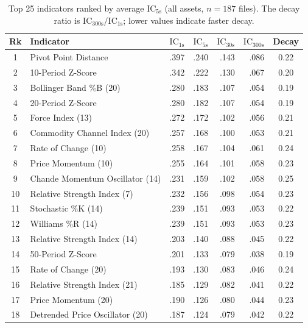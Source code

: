 \documentclass[12pt,a4paper]{article}
\theoremstyle{definition}
\theoremstyle{remark}
\newcommand{\IC}{\mathrm{IC}}
\begin{document}
\begin{table}[H]
\centering
\caption{Top 25 indicators ranked by average $\IC_{5\text{s}}$
  (all assets, $n=187$ files). The decay ratio is
  $\IC_{300\text{s}}/\IC_{1\text{s}}$; lower values indicate
  faster decay.}
\label{tab:top25}
\small
\setlength{\tabcolsep}{4pt}
\begin{tabular}{clrrrrc}
\toprule
\textbf{Rk} & \textbf{Indicator} &
  $\IC_{1\text{s}}$ & $\IC_{5\text{s}}$ &
  $\IC_{30\text{s}}$ & $\IC_{300\text{s}}$ & \textbf{Decay} \\
\midrule
 1 & Pivot Point Distance       & .397 & .240 & .143 & .086 & 0.22 \\
 2 & 10-Period Z-Score        & .342 & .222 & .130 & .067 & 0.20 \\
 3 & Bollinger Band \%B (20)    & .280 & .183 & .107 & .054 & 0.19 \\
 4 & 20-Period Z-Score        & .280 & .182 & .107 & .054 & 0.19 \\
 5 & Force Index (13)  & .272 & .172 & .102 & .056 & 0.21 \\
 6 & Commodity Channel Index (20)           & .257 & .168 & .100 & .053 & 0.21 \\
 7 & Rate of Change (10)           & .258 & .167 & .104 & .061 & 0.24 \\
 8 & Price Momentum (10)      & .255 & .164 & .101 & .058 & 0.23 \\
 9 & Chande Momentum Oscillator (14)           & .231 & .159 & .102 & .058 & 0.25 \\
10 & Relative Strength Index (7)            & .232 & .156 & .098 & .054 & 0.23 \\
11 & Stochastic \%K (14)      & .239 & .151 & .093 & .053 & 0.22 \\
12 & Williams \%R (14)   & .239 & .151 & .093 & .053 & 0.23 \\
13 & Relative Strength Index (14)           & .203 & .140 & .088 & .045 & 0.22 \\
14 & 50-Period Z-Score        & .201 & .133 & .079 & .038 & 0.19 \\
15 & Rate of Change (20)           & .193 & .130 & .083 & .046 & 0.24 \\
16 & Relative Strength Index (21)           & .185 & .129 & .082 & .041 & 0.22 \\
17 & Price Momentum (20)      & .190 & .126 & .080 & .044 & 0.23 \\
18 & Detrended Price Oscillator (20)           & .187 & .124 & .079 & .042 & 0.22 \\

\end{tabular}
\end{table}
\end{document}
